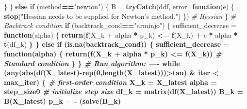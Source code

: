 \documentclass[
]{book}
\newenvironment{Shaded}{\begin{snugshade}}{\end{snugshade}}
\newcommand{\CommentTok}[1]{\textcolor[rgb]{0.56,0.35,0.01}{\textit{#1}}}
\newcommand{\ControlFlowTok}[1]{\textcolor[rgb]{0.13,0.29,0.53}{\textbf{#1}}}
\newcommand{\DataTypeTok}[1]{\textcolor[rgb]{0.13,0.29,0.53}{#1}}
\newcommand{\DecValTok}[1]{\textcolor[rgb]{0.00,0.00,0.81}{#1}}
\newcommand{\KeywordTok}[1]{\textcolor[rgb]{0.13,0.29,0.53}{\textbf{#1}}}
\newcommand{\NormalTok}[1]{#1}
\newcommand{\OperatorTok}[1]{\textcolor[rgb]{0.81,0.36,0.00}{\textbf{#1}}}
\newcommand{\StringTok}[1]{\textcolor[rgb]{0.31,0.60,0.02}{#1}}
\begin{document}
\begin{Shaded}
\begin{Highlighting}[]
\NormalTok{    \}}
\NormalTok{  \} }\ControlFlowTok{else} \ControlFlowTok{if}\NormalTok{ (method}\OperatorTok{==}\StringTok{"newton"}\NormalTok{) \{}
\NormalTok{    B =}\StringTok{ }\KeywordTok{tryCatch}\NormalTok{(ddf, }\DataTypeTok{error=}\ControlFlowTok{function}\NormalTok{(e) \{}
      \KeywordTok{stop}\NormalTok{(}\StringTok{"Hessian needs to be supplied for Newton's method."}\NormalTok{)}
\NormalTok{    \}) }\CommentTok{# Hessian}
\NormalTok{  \}}
  \CommentTok{# Backtrack condition}
  \ControlFlowTok{if}\NormalTok{ (backtrack_cond}\OperatorTok{==}\StringTok{"arminjo"}\NormalTok{) \{}
\NormalTok{    sufficient_decrease =}\StringTok{ }\ControlFlowTok{function}\NormalTok{(alpha) \{}
      \KeywordTok{return}\NormalTok{(}\KeywordTok{f}\NormalTok{(X_k }\OperatorTok{+}\StringTok{ }\NormalTok{alpha }\OperatorTok{*}\StringTok{ }\NormalTok{p_k) }\OperatorTok{<=}\StringTok{ }\KeywordTok{f}\NormalTok{(X_k) }\OperatorTok{+}\StringTok{ }\NormalTok{c }\OperatorTok{*}\StringTok{ }\NormalTok{alpha }\OperatorTok{*}\StringTok{ }\KeywordTok{t}\NormalTok{(df_k) }\OperatorTok{%
\NormalTok{    \}}
\NormalTok{  \} }\ControlFlowTok{else} \ControlFlowTok{if}\NormalTok{ (}\KeywordTok{is.na}\NormalTok{(backtrack_cond)) \{}
\NormalTok{    sufficient_decrease =}\StringTok{ }\ControlFlowTok{function}\NormalTok{(alpha) \{}
      \KeywordTok{return}\NormalTok{(}\KeywordTok{f}\NormalTok{(X_k }\OperatorTok{+}\StringTok{ }\NormalTok{alpha }\OperatorTok{*}\StringTok{ }\NormalTok{p_k) }\OperatorTok{<=}\StringTok{ }\KeywordTok{f}\NormalTok{(X_k)) }\CommentTok{# Standard condition}
\NormalTok{    \}}
\NormalTok{  \}}
  \CommentTok{# Run algorithm: ----}
  \ControlFlowTok{while}\NormalTok{ (}\KeywordTok{any}\NormalTok{(}\KeywordTok{abs}\NormalTok{(}\KeywordTok{df}\NormalTok{(X_latest)}\OperatorTok{-}\KeywordTok{rep}\NormalTok{(}\DecValTok{0}\NormalTok{,}\KeywordTok{length}\NormalTok{(X_latest)))}\OperatorTok{>}\NormalTok{tau) }\OperatorTok{&}\StringTok{ }\NormalTok{iter }\OperatorTok{<}\StringTok{ }\NormalTok{max_iter) \{ }\CommentTok{# first-order condition}
\NormalTok{    X_k =}\StringTok{ }\NormalTok{X_latest}
\NormalTok{    alpha =}\StringTok{ }\NormalTok{step_size0 }\CommentTok{# initialize step size}
\NormalTok{    df_k =}\StringTok{ }\KeywordTok{matrix}\NormalTok{(}\KeywordTok{df}\NormalTok{(X_latest))}
\NormalTok{    B_k =}\StringTok{ }\KeywordTok{B}\NormalTok{(X_latest)}
\NormalTok{    p_k =}\StringTok{ }\OperatorTok{-}\StringTok{ }\NormalTok{(}\KeywordTok{solve}\NormalTok{(B_k) }\OperatorTok{%
}}
\end{Highlighting}
\end{Shaded}
\end{document}
